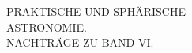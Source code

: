 \clearpage\begingroup\NoSourceHead{}
\HistoricalFoot{}{33\textsuperscript{*}}
\begin{center}
\vspace*{2.5in}
{\Large PRAKTISCHE UND SPHÄRISCHE\\[.15in]ASTRONOMIE.}\\[.45in]
{\large NACHTRÄGE ZU BAND VI.}
\end{center}
\clearpage\endgroup
